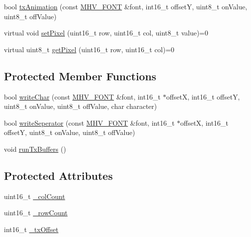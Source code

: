 \begin{DoxyCompactItemize}
\item 
bool \hyperlink{class_m_h_v___display___monochrome_a2a2a31b95c62535cd378880f27e0a148}{tx\-Animation} (const \hyperlink{_m_h_v___font_8h_ab7088ba808ac223275dfd526d198356f}{\-M\-H\-V\-\_\-\-F\-O\-N\-T} \&font, int16\-\_\-t offset\-Y, uint8\-\_\-t on\-Value, uint8\-\_\-t off\-Value)
\item 
virtual void \hyperlink{class_m_h_v___display___monochrome_a58a17e8662802e7f5d6ccd6f0bcc51a0}{set\-Pixel} (uint16\-\_\-t row, uint16\-\_\-t col, uint8\-\_\-t value)=0
\item 
virtual uint8\-\_\-t \hyperlink{class_m_h_v___display___monochrome_a80573e21b6b455fdd79c9d7d0a981492}{get\-Pixel} (uint16\-\_\-t row, uint16\-\_\-t col)=0
\end{DoxyCompactItemize}
\subsection*{\-Protected \-Member \-Functions}
\begin{DoxyCompactItemize}
\item 
bool \hyperlink{class_m_h_v___display___monochrome_ad0321aa7b9fa5a0de26ad5e4ff17f006}{write\-Char} (const \hyperlink{_m_h_v___font_8h_ab7088ba808ac223275dfd526d198356f}{\-M\-H\-V\-\_\-\-F\-O\-N\-T} \&font, int16\-\_\-t $\ast$offset\-X, int16\-\_\-t offset\-Y, uint8\-\_\-t on\-Value, uint8\-\_\-t off\-Value, char character)
\item 
bool \hyperlink{class_m_h_v___display___monochrome_ad82b9b17a337cb193e5385cf212bbfb3}{write\-Seperator} (const \hyperlink{_m_h_v___font_8h_ab7088ba808ac223275dfd526d198356f}{\-M\-H\-V\-\_\-\-F\-O\-N\-T} \&font, int16\-\_\-t $\ast$offset\-X, int16\-\_\-t offset\-Y, uint8\-\_\-t on\-Value, uint8\-\_\-t off\-Value)
\item 
void \hyperlink{class_m_h_v___display___monochrome_a7abdfbe71e00421a4275760ab6632b4a}{run\-Tx\-Buffers} ()
\end{DoxyCompactItemize}
\subsection*{\-Protected \-Attributes}
\begin{DoxyCompactItemize}
\item 
uint16\-\_\-t \hyperlink{class_m_h_v___display___monochrome_ae34bd61b8cffa2ee240bfe29f49a99d2}{\-\_\-col\-Count}
\item 
uint16\-\_\-t \hyperlink{class_m_h_v___display___monochrome_a29a7a7b8ceaf0ce0087002b9458d5074}{\-\_\-row\-Count}
\item 
int16\-\_\-t \hyperlink{class_m_h_v___display___monochrome_a75607cd77067ab059e8962e666593d4e}{\-\_\-tx\-Offset}
\end{DoxyCompactItemize}


